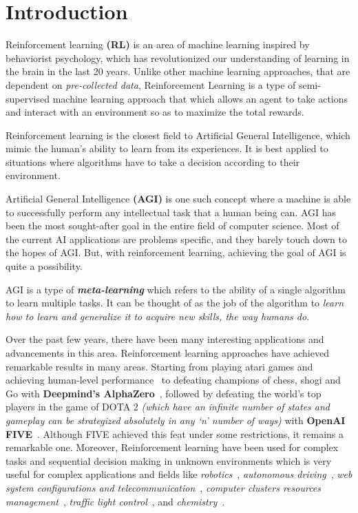 
\chapter{Introduction}\label{chapter:introduction}

Reinforcement learning \textbf{(RL)} is an area of machine learning inspired by behaviorist psychology, which has revolutionized our understanding of learning in the brain in the last 20 years. Unlike other machine learning approaches, that are dependent on \textit{pre-collected data}, Reinforcement Learning is a type of semi-supervised machine learning approach that which allows an agent to take actions and interact with an environment so as to maximize the total rewards.

Reinforcement learning is the closest field to Artificial General Intelligence, which mimic the human’s ability to learn from its experiences. It is best applied to situations where algorithms have to take a decision according to their environment.

Artificial General Intelligence \textbf{(AGI)} is one such concept where a machine is able to successfully perform any intellectual task that a human being can. AGI has been the most sought-after goal in the entire field of computer science. Most of the current AI applications are problems specific, and they barely touch down to the hopes of AGI. But, with reinforcement learning, achieving the goal of AGI is quite a possibility.

AGI is a type of \textit{\textbf{meta-learning}} which refers to the ability of a single algorithm to learn multiple tasks. It can be thought of as the job of the algorithm to \textit{learn how to learn and generalize it to acquire new skills, the way humans do.}

Over the past few years, there have been many interesting applications and advancements in this area. Reinforcement learning approaches have achieved remarkable results in many areas. Starting from playing atari games and achieving human-level performance~\parencite{mnih2015human} to defeating champions of chess, shogi and Go with \textbf{Deepmind's AlphaZero}~\parencite{silver2017mastering}, followed by defeating the world’s top players in the game of DOTA 2 \textit{(which  have an infinite number of states and gameplay can be strategized absolutely in any ‘n’ number of ways)} with \textbf{OpenAI FIVE}~\parencite{OpenAI_dota}. Although FIVE achieved this feat under some restrictions, it remains a remarkable one. Moreover, Reinforcement learning have been used for complex tasks and sequential decision making in unknown environments which is very useful for complex applications and fields like \textit{robotics}~\parencite{kober2013reinforcement, levine2016end, 45926, singh2019end}, \textit{autonomous driving}~\parencite{sallab2017deep, xu2018zero}, \textit{web system configurations and telecommunication}~\parencite{bu2009reinforcement}, \textit{computer clusters resources management}~\parencite{mao2016resource}, \textit{traffic light control}~\parencite{arel2010reinforcement}, and \textit{chemistry}~\parencite{zhou2017optimizing}.


